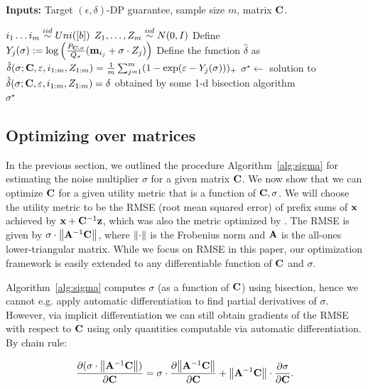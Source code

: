 \begin{algorithm}[htb]
\caption{Finding $\sigma$} \label{alg:sigma}
 \hspace*{\algorithmicindent} \textbf{Inputs:} Target $(\epsilon, \delta)$-DP guarantee, sample size $m$, matrix $\mathbf{C}$.
\begin{algorithmic}[1]
\State $i_1\dots i_m \stackrel{iid}{\sim} Uni([b])$ \State $Z_1, \dots, Z_m \stackrel{iid}{\sim} N(0, I)$
\State Define $Y_j(\sigma) := \log\left(\frac{P_{\mathbf{C},\sigma}}{Q_\sigma}(\mathbf{m}_{i_j}+\sigma\cdot Z_j)\right)$
\State Define the function $\hat{\delta}$ as $\hat{\delta}(\sigma; \mathbf{C}, \varepsilon, i_{1:m}, Z_{1:m}) = \frac{1}{m} \sum_{j=1}^m (1-\exp(\varepsilon-Y_j(\sigma)))_+$
\State $\sigma^\star \leftarrow$ solution to $\hat{\delta}(\sigma; \mathbf{C}, \varepsilon, i_{1:m}, Z_{1:m})=\delta$ obtained by some 1-d bisection algorithm \\
\Return $\sigma^\star$
\end{algorithmic}
\end{algorithm}

\subsection{Optimizing over matrices}

In the previous section, we outlined the procedure Algorithm~\ref{alg:sigma} for estimating the noise multiplier $\sigma$ for a given matrix $\mathbf{C}$. 
We now show that we can optimize $\mathbf{C}$ for a given utility metric that is a function of $\mathbf{C}, \sigma$. We will choose the utility metric to be the RMSE (root mean squared error) of prefix sums of $\mathbf{x}$ achieved by $\mathbf{x} + \mathbf{C}^{-1} \mathbf{z}$, which was also the metric optimized by \citet{choquette2022multi, choquette2024amplified}. The RMSE is given by $\sigma \cdot {\left\Vert {\ensuremath{\mathbf{A}}^{-1}\ensuremath{\mathbf{C}}} \right\Vert}$, where ${\left\Vert {\cdot} \right\Vert}$ is the Frobenius norm and $\mathbf{A}$ is the all-ones lower-triangular matrix. While we focus on RMSE in this paper, our optimization framework is easily extended to any differentiable function of $\mathbf{C}$ and $\sigma$.

Algorithm~\ref{alg:sigma} computes $\sigma$ (as a function of $\mathbf{C}$) using bisection, hence we cannot e.g. apply automatic differentiation to find partial derivatives of $\sigma$. However, via implicit differentiation we can still obtain gradients of the RMSE with respect to $\mathbf{C}$ using only quantities computable via automatic differentiation. By chain rule:

\[\frac{\partial (\sigma \cdot {\left\Vert {\ensuremath{\mathbf{A}}^{-1}\ensuremath{\mathbf{C}}} \right\Vert})}{\partial \mathbf{C}} = \sigma \cdot \frac{\partial {\left\Vert {\ensuremath{\mathbf{A}}^{-1}\ensuremath{\mathbf{C}}} \right\Vert}}{\partial \mathbf{C}} + {\left\Vert {\ensuremath{\mathbf{A}}^{-1}\ensuremath{\mathbf{C}}} \right\Vert} \cdot \frac{\partial \sigma}{\partial \mathbf{C}}.\]

